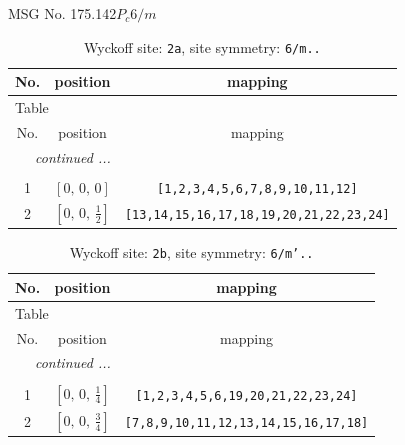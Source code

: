 \documentclass[fleqn,8pt]{jsarticle}
\begin{document}
\setcounter{MaxMatrixCols}{32}

\renewcommand{\tablename}{Table~}
\renewcommand{\figurename}{Figure~}
\begin{center}
\LARGE
MSG No. 175.142\quad$P_{c}6/m$
\end{center}
\renewcommand{\arraystretch}{1.2}
\begin{longtable}{ccc}
\caption{Wyckoff site: {\tt 2a}, site symmetry: {\tt 6/m..}}
 \\
 \hline \hline
No. & position & mapping \\ \hline \endfirsthead

\multicolumn{2}{l}{\tablename\ \thetable{}} \\
 \hline \hline
No. & position & mapping \\ \hline \endhead

 \hline \hline
\multicolumn{2}{r}{\footnotesize\it continued ...} \\ \endfoot

 \hline \hline
\multicolumn{2}{r}{} \\ \endlastfoot

1 & $\left[ 0,\, 0,\, 0 \right]$ & {\tt [1,2,3,4,5,6,7,8,9,10,11,12]} \\ \hline
2 & $\left[ 0,\, 0,\, \frac{1}{2} \right]$ & {\tt [13,14,15,16,17,18,19,20,21,22,23,24]} \\
\end{longtable}
\renewcommand{\arraystretch}{1.2}
\begin{longtable}{ccc}
\caption{Wyckoff site: {\tt 2b}, site symmetry: {\tt 6/m'..}}
 \\
 \hline \hline
No. & position & mapping \\ \hline \endfirsthead

\multicolumn{2}{l}{\tablename\ \thetable{}} \\
 \hline \hline
No. & position & mapping \\ \hline \endhead

 \hline \hline
\multicolumn{2}{r}{\footnotesize\it continued ...} \\ \endfoot

 \hline \hline
\multicolumn{2}{r}{} \\ \endlastfoot

1 & $\left[ 0,\, 0,\, \frac{1}{4} \right]$ & {\tt [1,2,3,4,5,6,19,20,21,22,23,24]} \\ \hline
2 & $\left[ 0,\, 0,\, \frac{3}{4} \right]$ & {\tt [7,8,9,10,11,12,13,14,15,16,17,18]} \\
\end{longtable}
\end{document}

